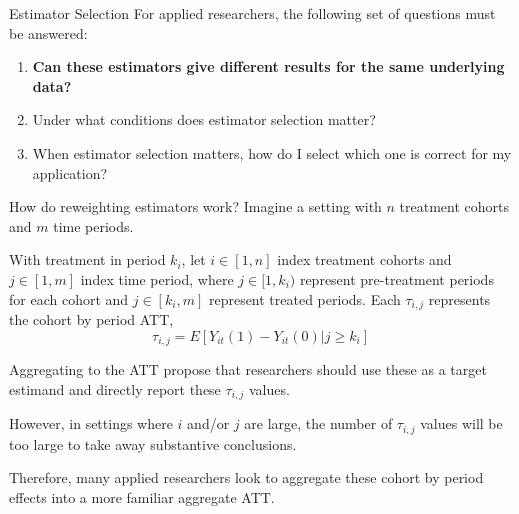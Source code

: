 \documentclass[11pt]{beamer}
\begin{document}
\begin{frame}{Estimator Selection}
    For applied researchers, the following set of questions must be answered:
    \begin{enumerate}
        \item \textbf<2->{Can these estimators give different results for the same underlying data?}
        \item Under what conditions does estimator selection matter?
        \item When estimator selection matters, how do I select which one is correct for my application?
    \end{enumerate}
\end{frame}

\begin{frame}{How do reweighting estimators work?}
    Imagine a setting with $n$ treatment cohorts and $m$ time periods.
    
    \vspace{2.5mm}

    

    With treatment in period $k_i$, let $i \in [1,n]$ index treatment cohorts and $j \in [1,m]$ index time period, where $j \in [1,k_i)$ represent pre-treatment periods for each cohort and $j \in [k_i,m]$ represent treated periods. Each $\tau_{i,j}$ represents the cohort by period ATT, 
    \begin{equation}
        \tau_{i,j} = E[Y_{it}(1) - Y_{it}(0) | j \geq k_i ]
    \end{equation}

\end{frame}

\begin{frame}{Aggregating to the ATT}    
    \textcite{callaway2021difference} propose that researchers should use these as a target estimand and directly report these $\tau_{i,j}$ values. 

    \vspace{2.5mm}
    
    However, in settings where $i$ and/or $j$ are large, the number of $\tau_{i,j}$ values will be too large to take away substantive conclusions. 
    
\vspace{2.5mm}
    
    Therefore, many applied researchers look to aggregate these cohort by period effects into a more familiar aggregate ATT.
\end{frame}
\end{document}
